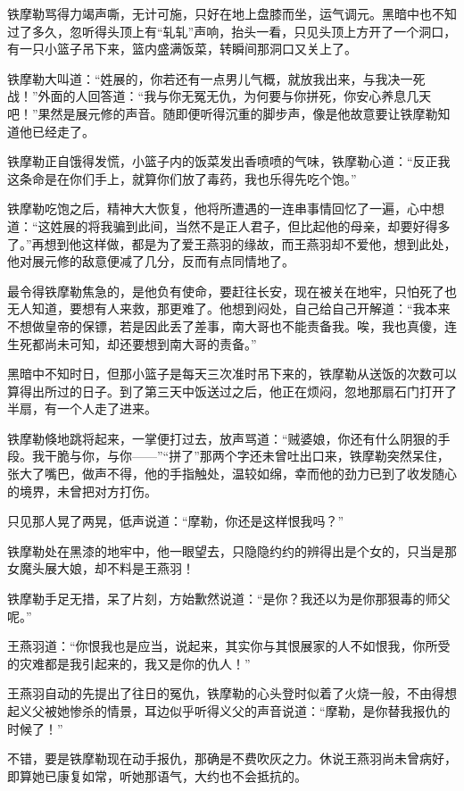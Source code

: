 \documentclass[12pt,oneside]{book}
\begin{document}
铁摩勒骂得力竭声嘶，无计可施，只好在地上盘膝而坐，运气调元。黑暗中也不知过了多久，忽听得头顶上有``轧轧''声响，抬头一看，只见头顶上方开了一个洞口，有一只小篮子吊下来，篮内盛满饭菜，转瞬间那洞口又关上了。

铁摩勒大叫道：``姓展的，你若还有一点男儿气概，就放我出来，与我决一死战！''外面的人回答道：``我与你无冤无仇，为何要与你拼死，你安心养息几天吧！''果然是展元修的声音。随即便听得沉重的脚步声，像是他故意要让铁摩勒知道他已经走了。

铁摩勒正自饿得发慌，小篮子内的饭菜发出香喷喷的气味，铁摩勒心道：``反正我这条命是在你们手上，就算你们放了毒药，我也乐得先吃个饱。''

铁摩勒吃饱之后，精神大大恢复，他将所遭遇的一连串事情回忆了一遍，心中想道：``这姓展的将我骗到此间，当然不是正人君子，但比起他的母亲，却要好得多了。''再想到他这样做，都是为了爱王燕羽的缘故，而王燕羽却不爱他，想到此处，他对展元修的敌意便减了几分，反而有点同情地了。

最令得铁摩勒焦急的，是他负有使命，要赶往长安，现在被关在地牢，只怕死了也无人知道，要想有人来救，那更难了。他想到闷处，自己给自己开解道：``我本来不想做皇帝的保镖，若是因此丢了差事，南大哥也不能责备我。唉，我也真傻，连生死都尚未可知，却还要想到南大哥的责备。''

黑暗中不知时日，但那小篮子是每天三次准时吊下来的，铁摩勒从送饭的次数可以算得出所过的日子。到了第三天中饭送过之后，他正在烦闷，忽地那扇石门打开了半扇，有一个人走了进来。

铁摩勒倏地跳将起来，一掌便打过去，放声骂道：``贼婆娘，你还有什么阴狠的手段。我干脆与你，与你------''``拼了''那两个字还未曾吐出口来，铁摩勒突然呆住，张大了嘴巴，做声不得，他的手指触处，温较如绵，幸而他的劲力已到了收发随心的境界，未曾把对方打伤。

只见那人晃了两晃，低声说道：``摩勒，你还是这样恨我吗？''

铁摩勒处在黑漆的地牢中，他一眼望去，只隐隐约约的辨得出是个女的，只当是那女魔头展大娘，却不料是王燕羽！

铁摩勒手足无措，呆了片刻，方始歉然说道：``是你？我还以为是你那狠毒的师父呢。''

王燕羽道：``你恨我也是应当，说起来，其实你与其恨展家的人不如恨我，你所受的灾难都是我引起来的，我又是你的仇人！''

王燕羽自动的先提出了往日的冤仇，铁摩勒的心头登时似着了火烧一般，不由得想起义父被她惨杀的情景，耳边似乎听得义父的声音说道：``摩勒，是你替我报仇的时候了！''

不错，要是铁摩勒现在动手报仇，那确是不费吹灰之力。休说王燕羽尚未曾病好，即算她已康复如常，听她那语气，大约也不会抵抗的。
\end{document}
